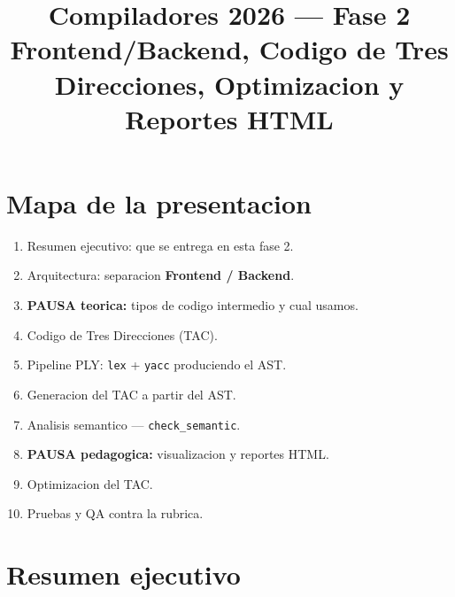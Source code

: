 \documentclass[11pt,a4paper]{article}
\title{\vspace{-1.2cm}\color{azulOscuro}\textbf{Compiladores 2026 --- Fase 2}\\[0.3em]
\large\color{black}Frontend/Backend, Codigo de Tres Direcciones, Optimizacion y Reportes HTML}
\author{}
\date{}
\begin{document}
\maketitle
\vspace{-1.2cm}

\section{Mapa de la presentacion}

\begin{enumerate}[leftmargin=*,nosep]
  \item Resumen ejecutivo: que se entrega en esta fase 2.
  \item Arquitectura: separacion \textbf{Frontend / Backend}.
  \item \textbf{PAUSA teorica:} tipos de codigo intermedio y cual usamos.
  \item Codigo de Tres Direcciones (TAC).
  \item Pipeline PLY: \texttt{lex} + \texttt{yacc} produciendo el AST.
  \item Generacion del TAC a partir del AST.
  \item Analisis semantico --- \texttt{check\_semantic}.
  \item \textbf{PAUSA pedagogica:} visualizacion y reportes HTML.
  \item Optimizacion del TAC.
  \item Pruebas y QA contra la rubrica.
\end{enumerate}

\section{Resumen ejecutivo}
\end{document}
